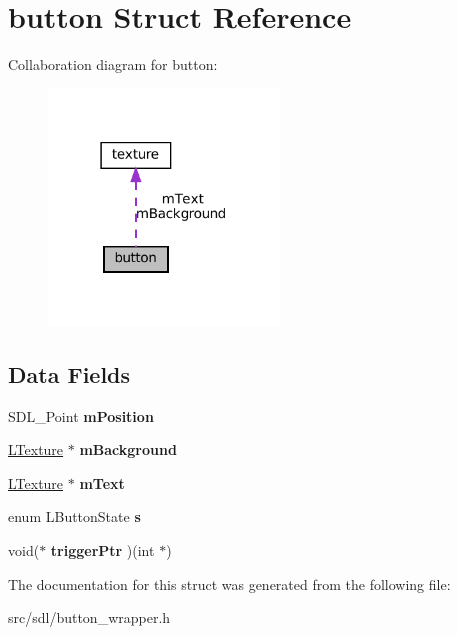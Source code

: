 \hypertarget{structbutton}{}\section{button Struct Reference}
\label{structbutton}


Collaboration diagram for button\+:
\nopagebreak
\begin{figure}[H]
\begin{center}
\leavevmode
\includegraphics[width=174pt]{structbutton__coll__graph}
\end{center}
\end{figure}
\subsection*{Data Fields}
\begin{DoxyCompactItemize}
\item 
\mbox{\label{structbutton_a565fe26ba3de4ef01d9d6a4b6b6725d2}} 
S\+D\+L\+\_\+\+Point {\bfseries m\+Position}
\item 
\mbox{\label{structbutton_a7eb136dcc643483eb579ed938c3cee33}} 
\hyperlink{structtexture}{L\+Texture} $\ast$ {\bfseries m\+Background}
\item 
\mbox{\label{structbutton_a411a3221c211bc7bc0a98ad71b16d288}} 
\hyperlink{structtexture}{L\+Texture} $\ast$ {\bfseries m\+Text}
\item 
\mbox{\label{structbutton_aaf55b59bca0d347c78a27dff0a9b201a}} 
enum L\+Button\+State {\bfseries s}
\item 
\mbox{\label{structbutton_a24b7101872d741490b84d97fcfb6ea48}} 
void($\ast$ {\bfseries trigger\+Ptr} )(int $\ast$)
\end{DoxyCompactItemize}


The documentation for this struct was generated from the following file\+:\begin{DoxyCompactItemize}
\item 
src/sdl/button\+\_\+wrapper.\+h\end{DoxyCompactItemize}
